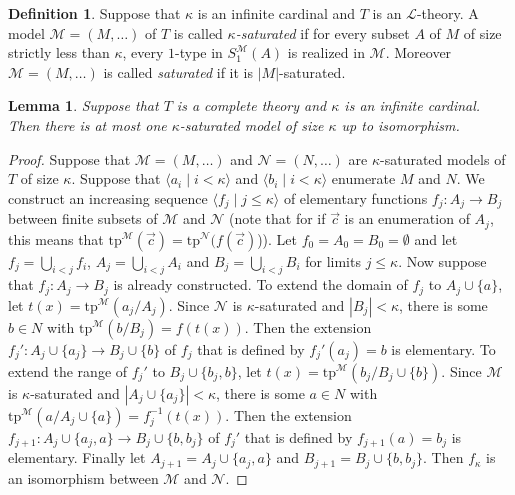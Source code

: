 \documentclass[10pt]{amsart}
\renewcommand{\L}{\mathcal{L}}
\newcommand{\MM}{\mathcal{M}}
\newcommand{\NN}{\mathcal{N}}
\newcommand{\tp}{\mathrm{tp}}
\newtheorem{lemma}[theorem]{Lemma}
\theoremstyle{definition}
\newtheorem{definition}[theorem]{Definition}
\theoremstyle{remark}
\begin{document}
\begin{definition} 
Suppose that $\kappa$ is an infinite cardinal and $T$ is an $\L$-theory. A model $\MM=(M,\dots)$ of $T$ is called \emph{$\kappa$-saturated} if for every subset $A$ of $M$ of size strictly less than $\kappa$, every $1$-type in $S_1^\MM(A)$ is realized in $\MM$. 
Moreover $\MM=(M,\dots)$ is called \emph{saturated} if it is $|M|$-saturated. 
\end{definition} 

\begin{lemma} \label{unique saturated model}
Suppose that $T$ is a complete theory and $\kappa$ is an infinite cardinal. Then there is at most one $\kappa$-saturated model of size $\kappa$ up to isomorphism. 
\end{lemma} 
\begin{proof} 
Suppose that $\MM=(M,\dots)$ and $\NN=(N,\dots)$ are $\kappa$-saturated models of $T$ of size $\kappa$. Suppose that $\langle a_i\mid i<\kappa\rangle$ and $\langle b_i\mid i<\kappa\rangle$ enumerate $M$ and $N$. We construct an increasing sequence $\langle f_j\mid j\leq\kappa\rangle$ of elementary functions $f_j\colon A_j\rightarrow B_j$ between finite subsets of $\MM$ and $\NN$ (note that for if $\vec{c}$ is an enumeration of $A_j$, this means that $\tp^\MM(\vec{c})=\tp^\NN(f(\vec{c})$)). Let $f_0=A_0=B_0=\emptyset$ and let $f_j=\bigcup_{i<j} f_i$, $A_j=\bigcup_{i<j} A_i$ and $B_j=\bigcup_{i<j}B_i$ for limits $j\leq\kappa$. Now suppose that $f_j\colon A_j\rightarrow B_j$ is already constructed. To extend the domain of $f_j$ to $A_j\cup\{a\}$, let $t(x)=\tp^\MM(a_j/A_j)$. Since $\NN$ is $\kappa$-saturated and $|B_j|<\kappa$, there is some $b\in N$ with $\tp^\MM(b/B_j)=f(t(x))$. Then the extension $f_j'\colon A_j\cup\{a_j\}\rightarrow  B_j\cup\{b\}$ of $f_j$ that is defined by $f_j'(a_j)=b$ is elementary. To extend the range of $f_j'$ to $B_j\cup\{b_j,b\}$, let $t(x)=\tp^\MM(b_j/B_j\cup\{b\})$. Since $\MM$ is $\kappa$-saturated and $|A_j\cup\{a_j\}|<\kappa$, there is some $a\in N$ with $\tp^\MM(a/A_j\cup\{a\})=f_j^{-1}(t(x))$. Then the extension $f_{j+1}\colon A_j\cup\{a_j,a\}\rightarrow  B_j\cup\{b,b_j\}$ of $f_j'$ that is defined by $f_{j+1}(a)=b_j$ is elementary. Finally let $A_{j+1}=A_j\cup\{a_j,a\}$ and $B_{j+1}=B_j\cup\{b,b_j\}$. Then $f_\kappa$ is an isomorphism between $\MM$ and $\NN$. 
\end{proof} 
\end{document}

